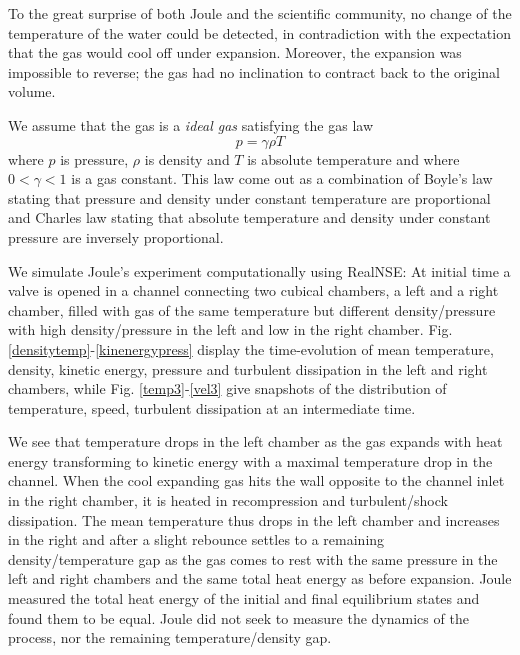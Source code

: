 To the great surprise of both Joule and the scientific community, no change 
of the temperature of the water could be detected, in contradiction with 
the expectation that the gas would cool off under expansion. 
Moreover, the expansion was impossible to reverse; the gas had no inclination
to contract back to the original volume.

We assume that the gas is a \emph{ideal gas} satisfying the gas law
\begin{equation}
p = \gamma \rho T
\end{equation}   
where $p$ is pressure, $\rho$ is density and $T$ is absolute temperature and where $0<\gamma < 1$ 
is a gas constant. This law come out as a combination of Boyle's law stating that pressure and density under constant temperature are proportional and Charles law stating that absolute temperature and density 
under constant pressure are inversely proportional.
  
We simulate Joule's experiment computationally using RealNSE: At initial time a valve is opened in a channel connecting 
two cubical chambers, a left and a right chamber, filled with gas of the same temperature but different 
density/pressure with high density/pressure in the left and low in the right chamber. 
Fig. \ref{densitytemp}-\ref{kinenergypress} display the time-evolution of mean temperature, density, kinetic 
energy, pressure and turbulent dissipation in the left and right chambers, while Fig. \ref{temp3}-\ref{vel3} give snapshots of the distribution of 
temperature, speed, turbulent dissipation at an intermediate time.

We see that temperature drops in the left chamber as the gas expands with heat energy transforming 
to kinetic energy with a maximal temperature drop in the channel. When the cool expanding gas hits 
the wall opposite to the channel inlet in the right chamber, it is heated in recompression and turbulent/shock dissipation. The mean temperature thus drops in the left chamber and 
increases in the right and after a slight rebounce settles to a remaining density/temperature gap as the gas comes to rest with the same pressure
in the left and right chambers and the same total heat energy as before expansion.
Joule measured the total heat energy of the initial and final equilibrium states and found them to be equal.
Joule did not seek to measure the dynamics of the process, nor the remaining temperature/density gap. 


